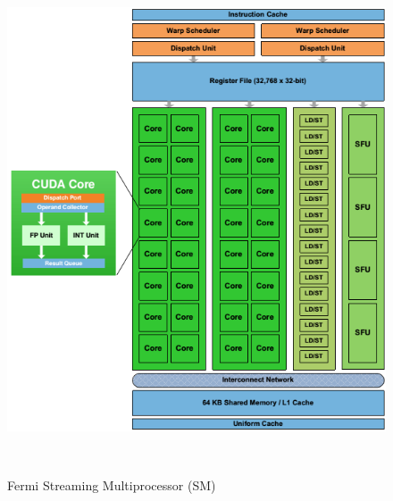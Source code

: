 \begin{figure}[H]
                      \centering
                              \includegraphics[height=15cm]{img/fermiSM.png}
                      \caption{Fermi Streaming Multiprocessor (SM)\cite{fermi}}
\end{figure}
